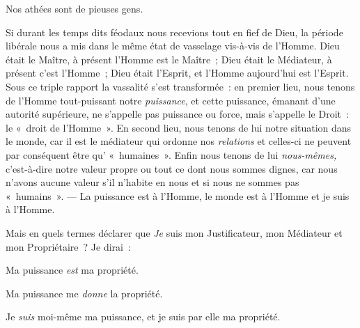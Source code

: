 \documentclass[french,twoside]{book} %
\begin{document}
Nos athées sont de pieuses gens.\par
Si durant les temps dits féodaux nous recevions tout en fief de Dieu, la période libérale nous a mis dans le même état de vasselage vis-à-vis de l’Homme. Dieu était le Maître, à présent l’Homme est le Maître ; Dieu était le Médiateur, à présent c’est l’Homme ; Dieu était l’Esprit, et l’Homme aujourd’hui est l’Esprit. Sous ce triple rapport la vassalité s’est transformée : en premier lieu, nous tenons de l’Homme tout-puissant notre \emph{puissance}, et cette puissance, émanant d’une autorité supérieure, ne s’appelle pas puissance ou force, mais s’appelle le Droit : le « droit de l’Homme ». En second lieu, nous tenons de lui notre situation dans le monde, car il est le médiateur qui  ordonne nos \emph{relations} et celles-ci ne peuvent par conséquent être qu’ « humaines ». Enfin nous tenons de lui \emph{nous-mêmes,} c’est-à-dire notre valeur propre ou tout ce dont nous sommes dignes, car nous n’avons aucune valeur s’il n’habite en nous et si nous ne sommes pas « humains ». — La puissance est à l’Homme, le monde est à l’Homme et je suis à l’Homme.\par
Mais en quels termes déclarer que \emph{Je} suis mon Justificateur, mon Médiateur et mon Propriétaire ? Je dirai :\par
Ma puissance \emph{est} ma propriété.\par
Ma puissance me \emph{donne} la propriété.\par
Je \emph{suis} moi-même ma puissance, et je suis par elle ma propriété.\par
\end{document}
